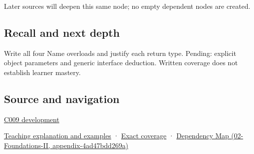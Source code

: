 Later sources will deepen this same node; no empty dependent nodes are created.

\subsection{Recall and next depth}\label{appendix-d42039b1d6f7-recall-and-next-depth}

Write all four Name overloads and justify each return type. Pending: explicit object parameters and generic interface deduction. Written coverage does not establish learner mastery.

\subsection{Source and navigation}\label{appendix-d42039b1d6f7-source-and-navigation}

\hyperref[appendix-fd090d982a15-m009---parts-127-147]{C009 development}

\hyperref[01-foundations-i-ch003-an-accessor-must-respect-the-callers-lifetime]{Teaching explanation and examples} · \hyperref[appendix-fd090d982a15-m008---parts-113-126]{Exact coverage} · \href{../02-Foundations-II/main.pdf\#nameddest=appendix-4ad47bdd269a}{Dependency Map (02-Foundations-II, appendix-4ad47bdd269a)}
